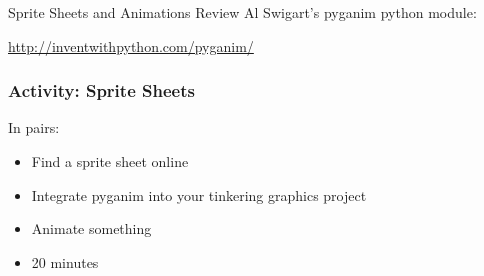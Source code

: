 \begin{frame}{Sprite Sheets and Animations}
	Review Al Swigart's pyganim python module: 
	
	\vspace{2em}
	
	\url{http://inventwithpython.com/pyganim/}
	
\end{frame}

\begin{frame}
	\frametitle{Activity: Sprite Sheets}
	
	In pairs:
	
	\vspace{2em}
	
	\begin{itemize}		
		\item Find a sprite sheet online
		\item Integrate pyganim into your tinkering graphics project
		\item Animate something
		\item 20 minutes
	\end{itemize}
\end{frame}


